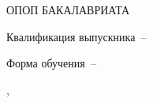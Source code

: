 \vspace{0pt plus6fill} 
\begin{center}%
{\large ОПОП БАКАЛАВРИАТА}\par
\MakeUppercase{\SpecialityOPOP}
\end{center}%

%
\vspace{0pt plus4fill} %
\begin{center}%
Квалификация выпускника~--~\Qualification\par
Форма обучения~--~\FormOfStudy
\end{center}%
%
\vspace{0pt plus4fill} 
\begin{center}%
{\MakeUppercase{\City},~\YearOfDocument}
\end{center}%
\newpage
